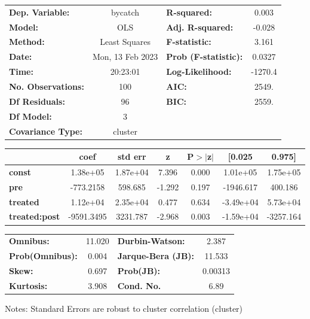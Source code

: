 \begin{center}
\begin{tabular}{lclc}
\toprule
\textbf{Dep. Variable:}    &     bycatch      & \textbf{  R-squared:         } &     0.003   \\
\textbf{Model:}            &       OLS        & \textbf{  Adj. R-squared:    } &    -0.028   \\
\textbf{Method:}           &  Least Squares   & \textbf{  F-statistic:       } &     3.161   \\
\textbf{Date:}             & Mon, 13 Feb 2023 & \textbf{  Prob (F-statistic):} &   0.0327    \\
\textbf{Time:}             &     20:23:01     & \textbf{  Log-Likelihood:    } &   -1270.4   \\
\textbf{No. Observations:} &         100      & \textbf{  AIC:               } &     2549.   \\
\textbf{Df Residuals:}     &          96      & \textbf{  BIC:               } &     2559.   \\
\textbf{Df Model:}         &           3      & \textbf{                     } &             \\
\textbf{Covariance Type:}  &     cluster      & \textbf{                     } &             \\
\bottomrule
\end{tabular}
\begin{tabular}{lcccccc}
                      & \textbf{coef} & \textbf{std err} & \textbf{z} & \textbf{P$> |$z$|$} & \textbf{[0.025} & \textbf{0.975]}  \\
\midrule
\textbf{const}        &     1.38e+05  &     1.87e+04     &     7.396  &         0.000        &     1.01e+05    &     1.75e+05     \\
\textbf{pre}          &    -773.2158  &      598.685     &    -1.292  &         0.197        &    -1946.617    &      400.186     \\
\textbf{treated}      &     1.12e+04  &     2.35e+04     &     0.477  &         0.634        &    -3.49e+04    &     5.73e+04     \\
\textbf{treated:post} &   -9591.3495  &     3231.787     &    -2.968  &         0.003        &    -1.59e+04    &    -3257.164     \\
\bottomrule
\end{tabular}
\begin{tabular}{lclc}
\textbf{Omnibus:}       & 11.020 & \textbf{  Durbin-Watson:     } &    2.387  \\
\textbf{Prob(Omnibus):} &  0.004 & \textbf{  Jarque-Bera (JB):  } &   11.533  \\
\textbf{Skew:}          &  0.697 & \textbf{  Prob(JB):          } &  0.00313  \\
\textbf{Kurtosis:}      &  3.908 & \textbf{  Cond. No.          } &     6.89  \\
\bottomrule
\end{tabular}
\end{center}

Notes: \newline
 [1] Standard Errors are robust to cluster correlation (cluster)